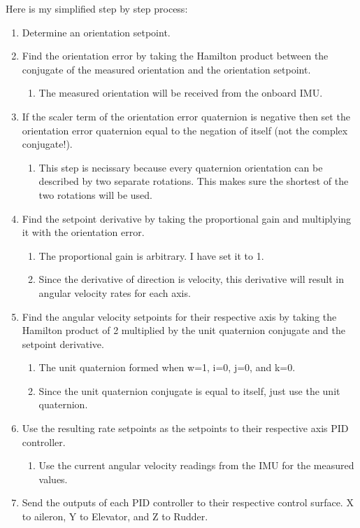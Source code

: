 \documentclass[11pt]{scrartcl} %
\begin{document}
Here is my simplified step by step process:
\begin{enumerate}
	\item Determine an orientation setpoint.
	\item Find the orientation error by taking the Hamilton product between the conjugate of the measured orientation and the orientation setpoint.
	\begin{enumerate}[label*=\arabic*.]
		\item The measured orientation will be received from the onboard IMU.
	\end{enumerate}
	\item If the scaler term of the orientation error quaternion is negative then set the orientation error quaternion equal to the negation of itself (not the complex conjugate!).
	\begin{enumerate}[label*=\arabic*.]
		\item This step is necissary because every quaternion orientation can be described by two separate rotations. This makes sure the shortest of the two rotations will be used. 
	\end{enumerate}
	\item Find the setpoint derivative by taking the proportional gain and multiplying it with the orientation error.
	\begin{enumerate}[label*=\arabic*.]
		\item The proportional gain is arbitrary. I have set it to 1.
		\item Since the derivative of direction is velocity, this derivative will result in angular velocity rates for each axis.
	\end{enumerate}
	\item Find the angular velocity setpoints for their respective axis by taking the Hamilton product of 2 multiplied by the unit quaternion conjugate and the setpoint derivative.
	\begin{enumerate}[label*=\arabic*.]
		\item The unit quaternion formed when  w=1, i=0, j=0, and k=0.
		\item Since the unit quaternion conjugate is equal to itself, just use the unit quaternion.
	\end{enumerate}
	\item Use the resulting rate setpoints as the setpoints to their respective axis PID controller.
	\begin{enumerate}[label*=\arabic*.]
		\item Use the current angular velocity readings from the IMU for the measured values.
	\end{enumerate}
	\item Send the outputs of each PID controller to their respective control surface. X to aileron, Y to Elevator, and Z to Rudder.
\end{enumerate}
\clearpage
\end{document}
